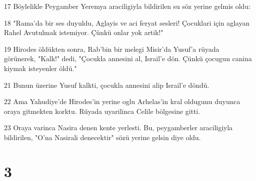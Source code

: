 \par 17 Böylelikle Peygamber Yeremya araciligiyla bildirilen su söz yerine gelmis oldu:
\par 18 "Rama'da bir ses duyuldu, Aglayis ve aci feryat sesleri! Çocuklari için aglayan Rahel Avutulmak istemiyor. Çünkü onlar yok artik!"
\par 19 Hirodes öldükten sonra, Rab'bin bir melegi Misir'da Yusuf'a rüyada görünerek, "Kalk!" dedi, "Çocukla annesini al, Israil'e dön. Çünkü çocugun canina kiymak isteyenler öldü."
\par 21 Bunun üzerine Yusuf kalkti, çocukla annesini alip Israil'e döndü.
\par 22 Ama Yahudiye'de Hirodes'in yerine oglu Arhelas'in kral oldugunu duyunca oraya gitmekten korktu. Rüyada uyarilinca Celile bölgesine gitti.
\par 23 Oraya varinca Nasira denen kente yerlesti. Bu, peygamberler araciligiyla bildirilen, "O'na Nasirali denecektir" sözü yerine gelsin diye oldu.

\chapter{3}

